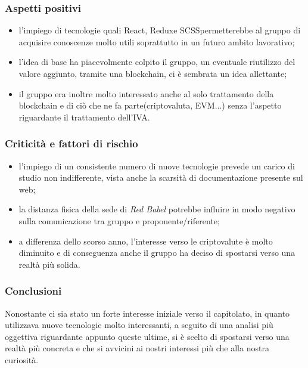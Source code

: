 \subsubsection{Aspetti positivi} 
\begin{itemize}
	\item l'impiego di tecnologie quali React\glo, Redux\glosp e SCSS\glosp permetterebbe al gruppo di acquisire conoscenze molto utili soprattutto in un futuro ambito lavorativo;	
	\item l'idea di base ha piacevolmente colpito il gruppo, un eventuale riutilizzo del valore aggiunto, tramite una blockchain\glo, ci è sembrata un idea allettante;	
	\item il gruppo era inoltre molto interessato anche al solo trattamento della blockchain e di ciò che ne fa parte(criptovaluta, EVM\glo...) senza l'aspetto riguardante il trattamento dell'IVA\glo.
\end{itemize}

\subsubsection{Criticità e fattori di rischio}
\begin{itemize}
	\item l'impiego di un consistente numero di nuove tecnologie prevede un carico di studio non indifferente, vista anche la scarsità di documentazione presente sul web;	
	\item la distanza fisica della sede di \textit{Red Babel} potrebbe influire in modo negativo sulla comunicazione tra gruppo e proponente/riferente; 	
	\item a differenza dello scorso anno, l'interesse verso le criptovalute è molto diminuito e di conseguenza anche il gruppo ha deciso di spostarsi verso una realtà più solida.  
\end{itemize}

\subsubsection{Conclusioni}
Nonostante ci sia stato un forte interesse iniziale verso il capitolato\glo, in quanto utilizzava nuove tecnologie molto interessanti, a seguito di una analisi più oggettiva riguardante appunto queste ultime, si è scelto di spostarsi verso una realtà più concreta e che si avvicini ai nostri interessi più che alla nostra curiosità.